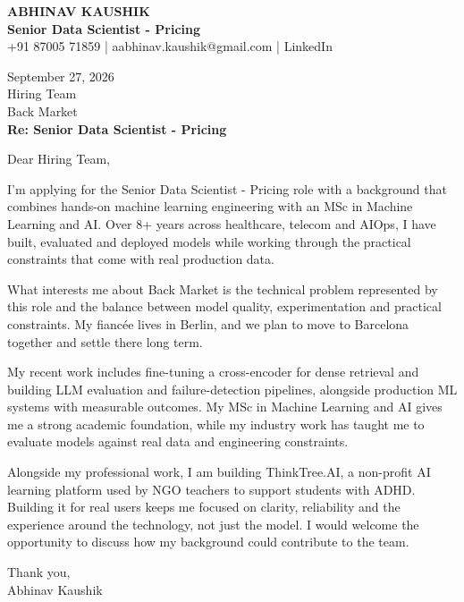 \documentclass[10pt,a4paper]{article}
\begin{document}
\begin{center}
{\Large\bfseries ABHINAV KAUSHIK}\\[2pt]
{\bfseries Senior Data Scientist - Pricing}\\[2pt]
+91 87005 71859 \quad | \quad aabhinav.kaushik@gmail.com \quad | \quad LinkedIn
\end{center}
\vspace{8pt}
September 27, 2026\\[6pt]
Hiring Team\\
Back Market\\[4pt]
\textbf{Re: Senior Data Scientist - Pricing}

Dear Hiring Team,

I’m applying for the Senior Data Scientist - Pricing role with a background that combines hands-on machine learning engineering with an MSc in Machine Learning and AI. Over 8+ years across healthcare, telecom and AIOps, I have built, evaluated and deployed models while working through the practical constraints that come with real production data.

What interests me about Back Market is the technical problem represented by this role and the balance between model quality, experimentation and practical constraints. My fiancée lives in Berlin, and we plan to move to Barcelona together and settle there long term.

My recent work includes fine-tuning a cross-encoder for dense retrieval and building LLM evaluation and failure-detection pipelines, alongside production ML systems with measurable outcomes. My MSc in Machine Learning and AI gives me a strong academic foundation, while my industry work has taught me to evaluate models against real data and engineering constraints.

Alongside my professional work, I am building ThinkTree.AI, a non-profit AI learning platform used by NGO teachers to support students with ADHD. Building it for real users keeps me focused on clarity, reliability and the experience around the technology, not just the model. I would welcome the opportunity to discuss how my background could contribute to the team.

Thank you,\\
Abhinav Kaushik
\end{document}
